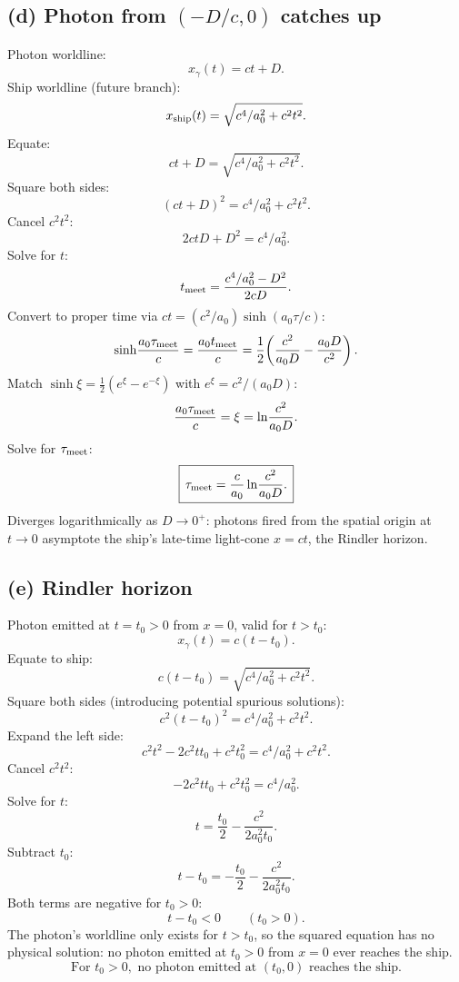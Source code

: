 \documentclass[11pt]{article}
\begin{document}
\subsection*{(d) Photon from $(-D/c,0)$ catches up}

Photon worldline:
\[ x_\gamma(t)=ct+D. \]
Ship worldline (future branch):
\[ x_{\rm ship}(t)=\sqrt{c^4/a_0^2+c^2t^2}. \]
Equate:
\[ ct+D=\sqrt{c^4/a_0^2+c^2t^2}. \]
Square both sides:
\[ (ct+D)^2=c^4/a_0^2+c^2t^2. \]
Cancel $c^2t^2$:
\[ 2ctD+D^2=c^4/a_0^2. \]
Solve for $t$:
\[ t_{\rm meet}=\frac{c^4/a_0^2-D^2}{2cD}. \]
Convert to proper time via $ct=(c^2/a_0)\sinh(a_0\tau/c)$:
\[ \sinh\!\frac{a_0\tau_{\rm meet}}{c}=\frac{a_0 t_{\rm meet}}{c}=\frac{1}{2}\!\left(\frac{c^2}{a_0D}-\frac{a_0D}{c^2}\right). \]
Match $\sinh\xi=\tfrac12(e^\xi-e^{-\xi})$ with $e^\xi=c^2/(a_0D)$:
\[ \frac{a_0\tau_{\rm meet}}{c}=\xi=\ln\!\frac{c^2}{a_0D}. \]
Solve for $\tau_{\rm meet}$:
\begin{equation}
\boxed{\,\tau_{\rm meet}=\frac{c}{a_0}\ln\!\frac{c^2}{a_0D}.\,}
\end{equation}
Diverges logarithmically as $D\to 0^+$: photons fired from the spatial origin at $t\to 0$ asymptote the ship's late-time light-cone $x=ct$, the Rindler horizon.

\subsection*{(e) Rindler horizon}

Photon emitted at $t=t_0>0$ from $x=0$, valid for $t>t_0$:
\[ x_\gamma(t)=c(t-t_0). \]
Equate to ship:
\[ c(t-t_0)=\sqrt{c^4/a_0^2+c^2t^2}. \]
Square both sides (introducing potential spurious solutions):
\[ c^2(t-t_0)^2=c^4/a_0^2+c^2t^2. \]
Expand the left side:
\[ c^2t^2-2c^2t t_0+c^2t_0^2=c^4/a_0^2+c^2t^2. \]
Cancel $c^2t^2$:
\[ -2c^2tt_0+c^2t_0^2=c^4/a_0^2. \]
Solve for $t$:
\[ t=\frac{t_0}{2}-\frac{c^2}{2a_0^2t_0}. \]
Subtract $t_0$:
\[ t-t_0=-\frac{t_0}{2}-\frac{c^2}{2a_0^2t_0}. \]
Both terms are negative for $t_0>0$:
\[ t-t_0<0\qquad(t_0>0). \]
The photon's worldline only exists for $t>t_0$, so the squared equation has no physical solution: no photon emitted at $t_0>0$ from $x=0$ ever reaches the ship.
\begin{equation}
\boxed{\,\text{For }t_0>0,\text{ no photon emitted at }(t_0,0)\text{ reaches the ship.}\,}
\end{equation}
\end{document}
